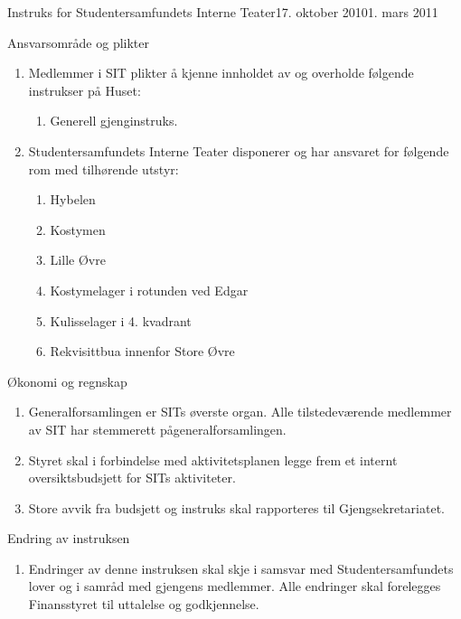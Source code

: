 \documentclass[../fsbok.tex]{subfiles}
\begin{document}
\begin{instruks}{Instruks for Studentersamfundets Interne Teater}{17. oktober 2010}{1. mars 2011 }
	\begin{instruksledd}{Ansvarsområde og plikter}
		\begin{enumerate}   
			\item  Medlemmer i SIT plikter å kjenne innholdet av og overholde følgende instrukser på
				Huset:
				\begin{enumerate}
					\item Generell gjenginstruks.
				\end{enumerate}
			\item Studentersamfundets Interne Teater disponerer og har ansvaret for følgende rom med
				tilhørende utstyr:
				\begin{enumerate}
					\item Hybelen
					\item Kostymen
					\item Lille Øvre
					\item Kostymelager i rotunden ved Edgar
					\item Kulisselager i 4. kvadrant
					\item Rekvisittbua innenfor Store Øvre
				\end{enumerate}
		\end{enumerate}
	\end{instruksledd}

	\begin{instruksledd}{Økonomi og regnskap}
		\begin{enumerate}
			\item Generalforsamlingen er SITs øverste organ. Alle tilstedeværende
				medlemmer av SIT har stemmerett pågeneralforsamlingen. 
			\item Styret skal i forbindelse med aktivitetsplanen legge frem et
				internt oversiktsbudsjett for SITs aktiviteter.
			\item Store avvik fra budsjett og instruks skal rapporteres til
				Gjengsekretariatet.
		\end{enumerate}  
	\end{instruksledd}


	\begin{instruksledd}{Endring av instruksen}
		\begin{enumerate}
			\item Endringer av denne instruksen skal skje i samsvar med
				Studentersamfundets lover og i samråd med gjengens medlemmer. Alle endringer skal forelegges
				Finansstyret til uttalelse og godkjennelse.		
		\end{enumerate}  
	\end{instruksledd}


\end{instruks}
\end{document}
